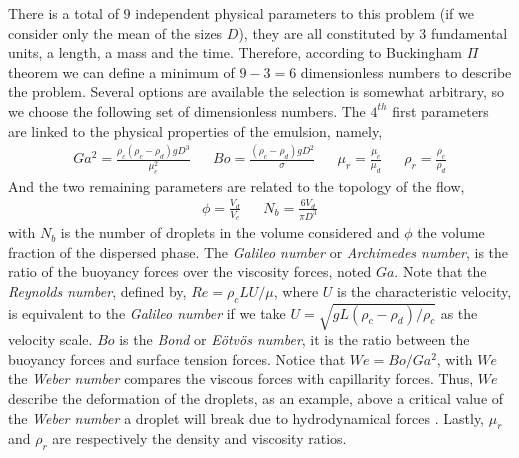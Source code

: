 There is a total of $9$ independent physical parameters to this problem (if we consider only the mean of the sizes $D$), they are all constituted by 3 fundamental units, a length, a mass and the time.
Therefore, according to Buckingham $\Pi$ theorem we can define a minimum of $9-3 = 6$ dimensionless numbers to describe the problem. 
Several options are available the selection is somewhat arbitrary, so we choose the following set of dimensionless numbers. 
The $4^{th}$ first parameters are linked to the physical properties of the emulsion, namely, 
\begin{align*}
    & Ga^2 =\frac{\rho_c(\rho_c - \rho_d) g D^3}{\mu^2_c}& 
    & Bo =\frac{(\rho_c - \rho_d) g D^2}{\sigma}&
    & \mu_r = \frac{\mu_c}{\mu_d}& 
    & \rho_r = \frac{\rho_c}{\rho_d}&
\end{align*}
And the two remaining parameters are related to the topology of the flow, 
\begin{align*}
    \phi = \frac{V_d}{V_c} & &
    N_b = \frac{6V_d}{\pi D^3}
\end{align*}
with $N_b$ is the number of droplets in the volume considered and $\phi$ the volume fraction of the dispersed phase.
The \textit{Galileo number} or \textit{Archimedes number}, is the ratio of the buoyancy forces over the viscosity forces, noted $Ga$.
Note that the \textit{Reynolds number}, defined by, $Re = \rho_c L U/\mu$, where $U$ is the characteristic velocity, is equivalent to the \textit{Galileo number} if we take $U = \sqrt{gL(\rho_c-\rho_d)/\rho_c}$ as the velocity scale.
$Bo$ is the \textit{Bond} or \textit{E\"otv\"os number}, it is the ratio between the buoyancy forces and surface tension forces. 
Notice that $We = Bo/Ga^2$, with $We$ the \textit{Weber number} compares the viscous forces with capillarity forces.
Thus, $We$ describe the deformation of the droplets, as an example, above a critical value of the \textit{Weber number} a droplet will break due to hydrodynamical forces \citet{deike2022direct}. 
Lastly, $\mu_r$ and $\rho_r$ are respectively the density and viscosity ratios. 

